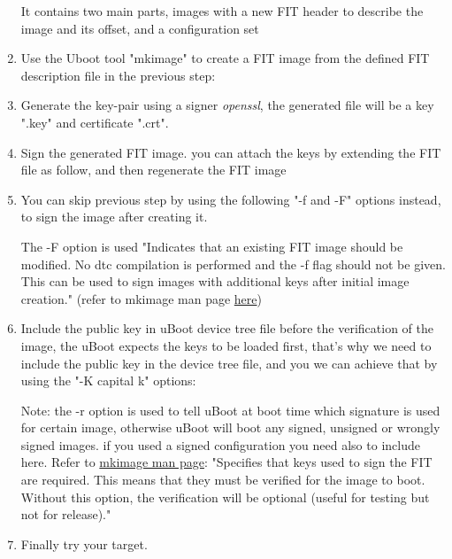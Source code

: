 \documentclass{article}
\begin{document}
\begin{enumerate}
        It contains two main parts, images with a new FIT header to describe the image and its offset, and a configuration set

    \item Use the Uboot tool "mkimage" to create a FIT image from the defined FIT description file in the previous step:
    

    \item Generate the key-pair using a signer \textit{openssl}, the generated file will be a key ".key" and certificate ".crt".
    

    \item Sign the generated FIT image. you can attach the keys by extending the FIT file as follow, and then regenerate the FIT image
    

    

    \item You can skip previous step by using the following "-f and -F" options instead, to sign the image after creating it. 
    
    The -F option is used "Indicates that an existing FIT image should be modified. No dtc compilation is performed and the -f flag should not be given. This can be used to sign images with additional keys after initial image creation." (refer to mkimage man page \href{https://manpages.debian.org/testing/u-boot-tools/mkimage.1.en.html}{here})

    \item Include the public key in uBoot device tree file
    before the verification of the image, the uBoot expects the keys to be loaded first, that's why we need to include the public key in the device tree file, and you we can achieve that by using the "-K capital k" options:
    
    
    Note: the -r option is used to tell uBoot at boot time which signature is used for certain image, otherwise uBoot will boot any signed, unsigned or wrongly signed images. if you used a signed configuration you need also to include here.
        Refer to \href{https://manpages.debian.org/testing/u-boot-tools/mkimage.1.en.html}{mkimage man page}: "Specifies that keys used to sign the FIT are required. This means that they must be verified for the image to boot. Without this option, the verification will be optional (useful for testing but not for release)."

    \item Finally try your target.
\end{enumerate}
\end{document}

